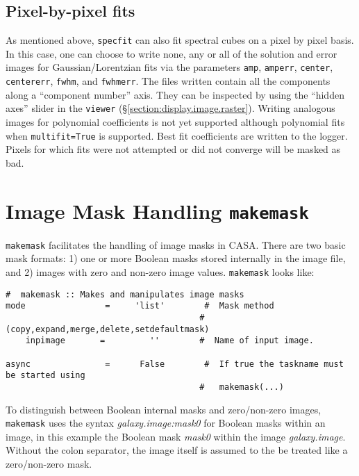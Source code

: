 \subsection{Pixel-by-pixel fits}
\label{section:analysis.specfit.pixel}
As mentioned above, {\tt specfit} can also fit spectral cubes on a
pixel by pixel basis. In this case, one can choose to write none, any
or all of the solution and error images for Gaussian/Lorentzian fits
via the parameters {\tt amp}, {\tt amperr}, {\tt center}, {\tt
  centererr}, {\tt fwhm}, and {\tt fwhmerr}. The files written contain
all the components along a ``component number'' axis. They can be
inspected by using the ``hidden axes'' slider in the {\tt viewer}
(\S\ref{section:display.image.raster}). Writing analogous images for
polynomial coefficients is not yet supported although polynomial fits
when {\tt multifit=True} is supported. Best fit coefficients are
written to the logger. Pixels for which fits were not attempted or did
not converge will be masked as bad.
 
\section{Image Mask Handling {\tt makemask}}
\label{section:analysis.makemask}

{\tt makemask} facilitates the handling of image masks in CASA. There
are two basic mask formats: 1) one or more Boolean masks stored
internally in the image file, and 2) images with zero and non-zero image
values. {\tt makemask} looks like:

\small
\begin{verbatim}
#  makemask :: Makes and manipulates image masks
mode                =     'list'        #  Mask method
                                       #   (copy,expand,merge,delete,setdefaultmask)
    inpimage       =         ''        #  Name of input image.

async               =      False        #  If true the taskname must be started using
                                       #   makemask(...) 
\end{verbatim}
\normalsize

To distinguish between Boolean internal masks and zero/non-zero
images, {\tt makemask} uses the syntax {\it galaxy.image:mask0} for Boolean
masks within an image, in this example the Boolean mask {\it mask0}
within the image {\it galaxy.image}. Without the colon separator, the image
itself is assumed to the be treated like a zero/non-zero mask.



